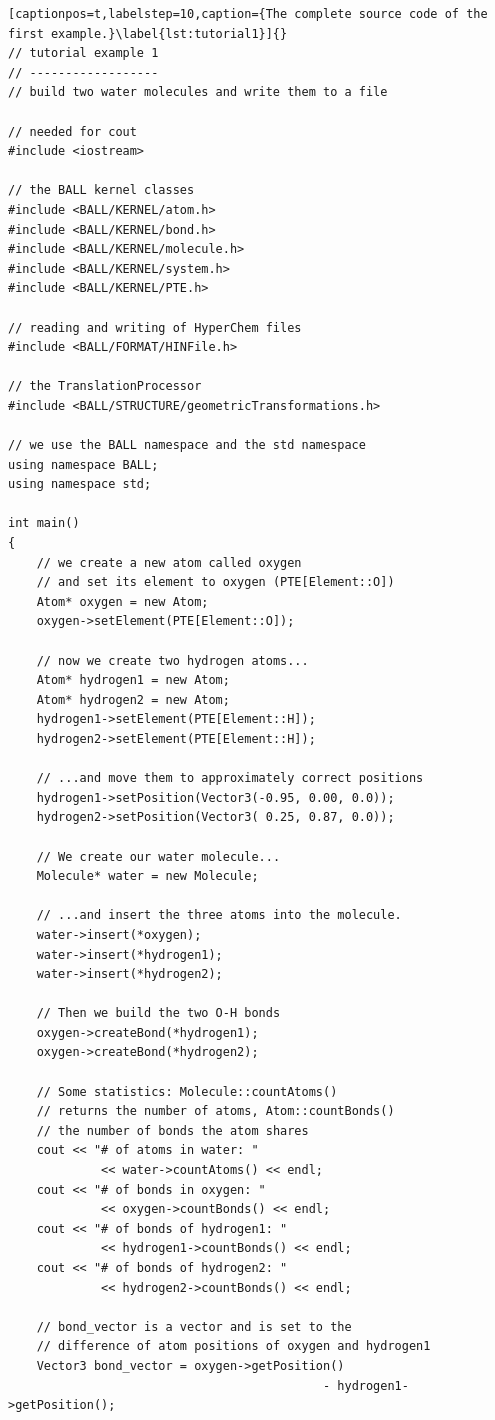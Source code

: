 \newpage
\begin{lstlisting}[captionpos=t,labelstep=10,caption={The complete source code of the first example.}\label{lst:tutorial1}]{}
// tutorial example 1
// ------------------
// build two water molecules and write them to a file

// needed for cout
#include <iostream>

// the BALL kernel classes
#include <BALL/KERNEL/atom.h>
#include <BALL/KERNEL/bond.h>
#include <BALL/KERNEL/molecule.h>
#include <BALL/KERNEL/system.h>
#include <BALL/KERNEL/PTE.h>

// reading and writing of HyperChem files
#include <BALL/FORMAT/HINFile.h>

// the TranslationProcessor
#include <BALL/STRUCTURE/geometricTransformations.h>

// we use the BALL namespace and the std namespace
using namespace BALL;
using namespace std;

int main()
{
	// we create a new atom called oxygen
	// and set its element to oxygen (PTE[Element::O])
	Atom* oxygen = new Atom;
	oxygen->setElement(PTE[Element::O]);

	// now we create two hydrogen atoms...
	Atom* hydrogen1 = new Atom;
	Atom* hydrogen2 = new Atom;
	hydrogen1->setElement(PTE[Element::H]);
	hydrogen2->setElement(PTE[Element::H]);

	// ...and move them to approximately correct positions
 	hydrogen1->setPosition(Vector3(-0.95, 0.00, 0.0));
 	hydrogen2->setPosition(Vector3( 0.25, 0.87, 0.0));

	// We create our water molecule...
	Molecule* water = new Molecule;

	// ...and insert the three atoms into the molecule.
	water->insert(*oxygen);
	water->insert(*hydrogen1);
	water->insert(*hydrogen2);

	// Then we build the two O-H bonds
	oxygen->createBond(*hydrogen1);
	oxygen->createBond(*hydrogen2);

	// Some statistics: Molecule::countAtoms() 
	// returns the number of atoms, Atom::countBonds() 
	// the number of bonds the atom shares
	cout << "# of atoms in water: " 
			 << water->countAtoms() << endl;
	cout << "# of bonds in oxygen: " 
			 << oxygen->countBonds() << endl;
	cout << "# of bonds of hydrogen1: " 
			 << hydrogen1->countBonds() << endl;
	cout << "# of bonds of hydrogen2: " 
			 << hydrogen2->countBonds() << endl;

	// bond_vector is a vector and is set to the
	// difference of atom positions of oxygen and hydrogen1
	Vector3 bond_vector = oxygen->getPosition() 
											- hydrogen1->getPosition();


\end{lstlisting}
